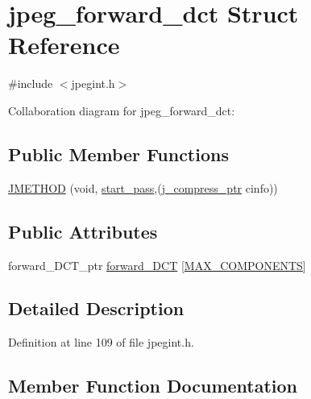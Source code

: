 \hypertarget{structjpeg__forward__dct}{}\section{jpeg\+\_\+forward\+\_\+dct Struct Reference}
\label{structjpeg__forward__dct}


{\ttfamily \#include $<$jpegint.\+h$>$}



Collaboration diagram for jpeg\+\_\+forward\+\_\+dct\+:
\subsection*{Public Member Functions}
\begin{DoxyCompactItemize}
\item 
\mbox{\hyperlink{structjpeg__forward__dct_a51b3b61e60becc93a36b41e26fd2c616}{J\+M\+E\+T\+H\+OD}} (void, \mbox{\hyperlink{jddctmgr_8c_a1964f006adb8fb80f57e455f6452aec1}{start\+\_\+pass}},(\mbox{\hyperlink{jpeglib_8h_add2a072c54e3a51550f4975f7ddb91e7}{j\+\_\+compress\+\_\+ptr}} cinfo))
\end{DoxyCompactItemize}
\subsection*{Public Attributes}
\begin{DoxyCompactItemize}
\item 
forward\+\_\+\+D\+C\+T\+\_\+ptr \mbox{\hyperlink{structjpeg__forward__dct_a227dc1b935c81ac94fc81521be709faf}{forward\+\_\+\+D\+CT}} \mbox{[}\mbox{\hyperlink{jmorecfg_8h_a6d8c910a1fdb6d4762a05f7250e64322}{M\+A\+X\+\_\+\+C\+O\+M\+P\+O\+N\+E\+N\+TS}}\mbox{]}
\end{DoxyCompactItemize}


\subsection{Detailed Description}


Definition at line 109 of file jpegint.\+h.



\subsection{Member Function Documentation}
\mbox{\label{structjpeg__forward__dct_a51b3b61e60becc93a36b41e26fd2c616}} 
